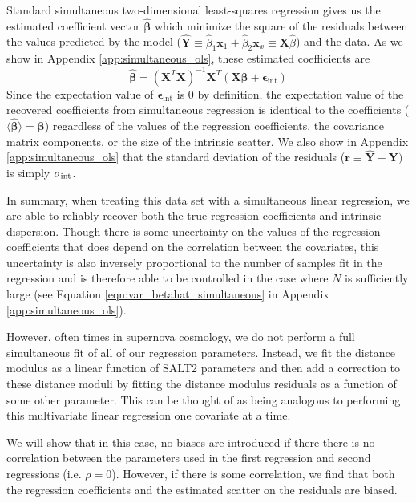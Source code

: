 Standard simultaneous two-dimensional least-squares regression gives us the estimated coefficient vector $\bm{\hat{\beta}}$ which minimize the square of the residuals between the values predicted by the model ($\bm{\hat{Y}} \equiv \hat{\beta}_1\bm{x}_1 + \hat{\beta}_2\bm{x}_x \equiv \bm{X}\hat{\beta}$) and the data. As we show in Appendix \ref{app:simultaneous_ols}, these estimated coefficients are
\begin{equation}
    \bm{\hat{\beta}} = (\bm{X}^T\bm{X})^{-1}\bm{X}^T(\bm{X\beta} + \bm{\epsilon}_\text{int})
\label{eqn:sim_beta_vec}
\end{equation}
Since the expectation value of $\bm{\epsilon}_\text{int}$ is 0 by definition, the expectation value of the recovered coefficients from simultaneous regression is identical to the coefficients ($\langle\bm{\hat{\beta}}\rangle=\bm{\beta}$) regardless of the values of the regression coefficients, the covariance matrix components, or the size of the intrinsic scatter. We also show in Appendix \ref{app:simultaneous_ols} that the standard deviation of the residuals ($\bm{r}\equiv\bm{\hat{Y}}-\bm{Y})$ is simply $\sigma_{\text{int}}$.

In summary, when treating this data set with a simultaneous linear regression, we are able to reliably recover both the true regression coefficients and intrinsic dispersion. Though there is some uncertainty on the values of the regression coefficients that does depend on the correlation between the covariates, this uncertainty is also inversely proportional to the number of samples fit in the regression and is therefore able to be controlled in the case where $N$ is sufficiently large (see Equation \ref{eqn:var_betahat_simultaneous} in Appendix \ref{app:simultaneous_ols}).

However, often times in supernova cosmology, we do not perform a full simultaneous fit of all of our regression parameters. Instead, we fit the distance modulus as a linear function of SALT2 parameters and then add a correction to these distance moduli by fitting the distance modulus residuals as a function of some other parameter. This can be thought of as being analogous to performing this multivariate linear regression one covariate at a time.

We will show that in this case, no biases are introduced if there there is no correlation between the parameters used in the first regression and second regressions (i.e. $\rho=0$). However, if there is some correlation, we find that both the regression coefficients and the estimated scatter on the residuals are biased.

